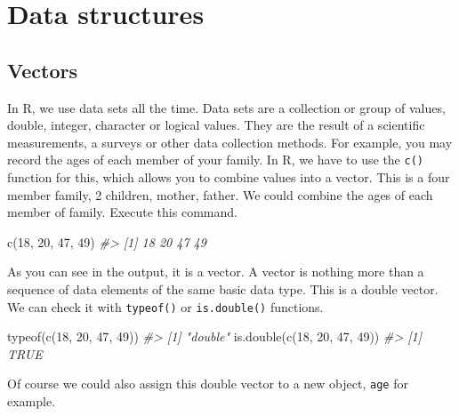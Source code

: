 \documentclass[
]{book}
\newenvironment{Shaded}{\begin{snugshade}}{\end{snugshade}}
\newcommand{\CommentTok}[1]{\textcolor[rgb]{0.56,0.35,0.01}{\textit{#1}}}
\newcommand{\DecValTok}[1]{\textcolor[rgb]{0.00,0.00,0.81}{#1}}
\newcommand{\FunctionTok}[1]{\textcolor[rgb]{0.00,0.00,0.00}{#1}}
\newcommand{\NormalTok}[1]{#1}
\begin{document}
\hypertarget{data-structures}{%
\section{Data structures}\label{data-structures}}

\hypertarget{vectors}{%
\subsection{Vectors}\label{vectors}}

In R, we use data sets all the time. Data sets are a collection or group of values, double, integer, character or logical values. They are the result of a scientific measurements, a surveys or other data collection methods. For example, you may record the ages of each member of your family. In R, we have to use the \texttt{c()} function for this, which allows you to combine values into a vector. This is a four member family, 2 children, mother, father. We could combine the ages of each member of family. Execute this command.

\begin{Shaded}
\begin{Highlighting}[]
\FunctionTok{c}\NormalTok{(}\DecValTok{18}\NormalTok{, }\DecValTok{20}\NormalTok{, }\DecValTok{47}\NormalTok{, }\DecValTok{49}\NormalTok{)}
\CommentTok{\#\textgreater{} [1] 18 20 47 49}
\end{Highlighting}
\end{Shaded}

As you can see in the output, it is a vector. A vector is nothing more than a sequence of data elements of the same basic data type. This is a double vector. We can check it with \texttt{typeof()} or \texttt{is.double()} functions.

\begin{Shaded}
\begin{Highlighting}[]
\FunctionTok{typeof}\NormalTok{(}\FunctionTok{c}\NormalTok{(}\DecValTok{18}\NormalTok{, }\DecValTok{20}\NormalTok{, }\DecValTok{47}\NormalTok{, }\DecValTok{49}\NormalTok{))}
\CommentTok{\#\textgreater{} [1] "double"}
\FunctionTok{is.double}\NormalTok{(}\FunctionTok{c}\NormalTok{(}\DecValTok{18}\NormalTok{, }\DecValTok{20}\NormalTok{, }\DecValTok{47}\NormalTok{, }\DecValTok{49}\NormalTok{))}
\CommentTok{\#\textgreater{} [1] TRUE}
\end{Highlighting}
\end{Shaded}

Of course we could also assign this double vector to a new object, \texttt{age} for example.
\end{document}
